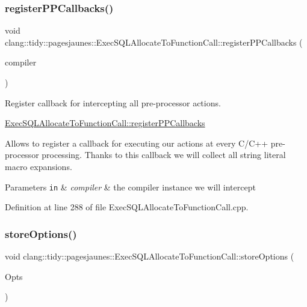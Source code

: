 \subsubsection{\texorpdfstring{register\+P\+P\+Callbacks()}{registerPPCallbacks()}}
{\footnotesize\ttfamily void clang\+::tidy\+::pagesjaunes\+::\+Exec\+S\+Q\+L\+Allocate\+To\+Function\+Call\+::register\+P\+P\+Callbacks (\begin{DoxyParamCaption}\item[{Compiler\+Instance \&}]{compiler }\end{DoxyParamCaption})\hspace{0.3cm}{\ttfamily [override]}}



Register callback for intercepting all pre-\/processor actions. 

\hyperlink{classclang_1_1tidy_1_1pagesjaunes_1_1_exec_s_q_l_allocate_to_function_call_a80535f19a5d3af09313adf439a679942}{Exec\+S\+Q\+L\+Allocate\+To\+Function\+Call\+::register\+P\+P\+Callbacks}

Allows to register a callback for executing our actions at every C/\+C++ pre-\/processor processing. Thanks to this callback we will collect all string literal macro expansions.


\begin{DoxyParams}[1]{Parameters}
\mbox{\tt in}  & {\em compiler} & the compiler instance we will intercept \\
\hline
\end{DoxyParams}


Definition at line 288 of file Exec\+S\+Q\+L\+Allocate\+To\+Function\+Call.\+cpp.

\mbox{\label{classclang_1_1tidy_1_1pagesjaunes_1_1_exec_s_q_l_allocate_to_function_call_ab85817e7ca5bfba6f3e690d8a721feaa}} 
\subsubsection{\texorpdfstring{store\+Options()}{storeOptions()}}
{\footnotesize\ttfamily void clang\+::tidy\+::pagesjaunes\+::\+Exec\+S\+Q\+L\+Allocate\+To\+Function\+Call\+::store\+Options (\begin{DoxyParamCaption}\item[{Clang\+Tidy\+Options\+::\+Option\+Map \&}]{Opts }\end{DoxyParamCaption})\hspace{0.3cm}{\ttfamily [override]}}



